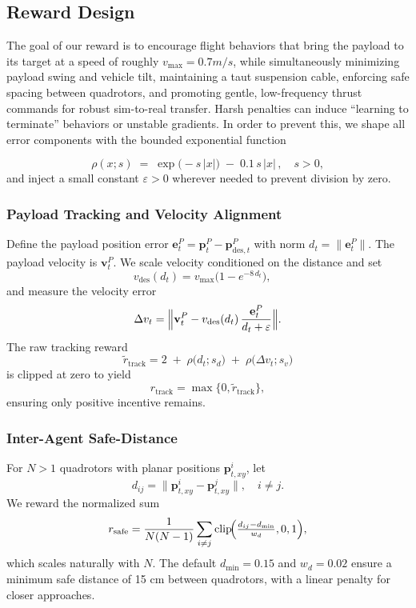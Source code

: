 \subsection{Reward Design}

The goal of our reward is to encourage flight behaviors that bring the payload to its target at a speed of roughly $ v_{\max} = 0.7m/s$, while simultaneously minimizing payload swing and vehicle tilt, maintaining a taut suspension cable, enforcing safe spacing between quadrotors, and promoting gentle, low-frequency thrust commands for robust sim-to-real transfer. Harsh penalties can induce “learning to terminate” behaviors or unstable gradients. In order to prevent this, we shape all error components with the bounded exponential function

\[
\rho(x; s) \;=\;\exp\bigl(-s\,|x|\bigr)\;-\;0.1\,s\,|x|\,,\quad s>0,
\]
and inject a small constant \(\varepsilon>0\) wherever needed to prevent division by zero.

\subsubsection{Payload Tracking and Velocity Alignment}
Define the payload position error \(\mathbf{e}^P_t = \mathbf{p}^P_t - \mathbf{p}^P_{\mathrm{des},t}\) with norm \(d_t = \|\mathbf{e}^P_t\|\).  The payload velocity is \(\mathbf{v}^P_t\).  We scale velocity conditioned on the distance and set
\[
v_{\mathrm{des}}(d_t)
= v_{\max}\bigl(1 - e^{-8\,d_t}\bigr),\quad
\]
and measure the velocity error
\[
\Delta v_t
= \Bigl\|\mathbf{v}^P_t - v_{\mathrm{des}}(d_t)\,\frac{\mathbf{e}^P_t}{d_t + \varepsilon}\Bigr\|.
\]
The raw tracking reward
\[
\tilde r_{\mathrm{track}}
= 2
\;+\;\rho\bigl(d_t; s_d\bigr)
\;+\;\rho\bigl(\Delta v_t; s_v\bigr)
\]
is clipped at zero to yield
\[
r_{\mathrm{track}}=\max\{0,\tilde r_{\mathrm{track}}\},
\]
ensuring only positive incentive remains.

\subsubsection{Inter-Agent Safe-Distance}
For \(N>1\) quadrotors with planar positions \(\mathbf{p}^i_{t,xy}\), let
\[
d_{ij} = \lVert\mathbf{p}^i_{t,xy}-\mathbf{p}^j_{t,xy}\rVert,\quad i\neq j.
\]
We reward the normalized sum
\[
r_{\mathrm{safe}}
= \frac{1}{N(N-1)}\sum_{i\neq j}\mathrm{clip}\!\Bigl(\tfrac{d_{ij}-d_{\min}}{w_d},0,1\Bigr),
\]
which scales naturally with \(N\). The default \(d_{\min}=0.15\) and \(w_d=0.02\) ensure a minimum safe distance of 15 cm between quadrotors, with a linear penalty for closer approaches.

